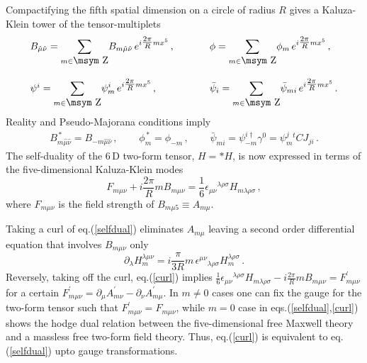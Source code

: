 \documentclass[a4paper,12pt]{article}
\def\Integer{{\mathop{\hbox{\msym \char  '132}}}}
\def\pr{{\textstyle{\frac{2\pi}{R}}}}
\begin{document}
\indent Compactifying the fifth spatial dimension on a circle of radius $R$ gives  
a Kaluza-Klein tower of the tensor-multiplets 
\begin{equation}
\begin{array}{ll}
B_{\hat{\mu}\hat{\nu}}=\displaystyle{\sum_{m\in\Integer}}B_{m\hat{\mu}\hat{\nu}}\,e^{i\pr mx^{5}}\,,~~~~&~~~~
\phi=\displaystyle{\sum_{m\in\Integer}}\phi_{m}\,e^{i\pr mx^{5}}\,,\\
{}&{}\\
\psi^{i}=\displaystyle{\sum_{m\in\Integer}}\psi^{i}_{m}\,e^{i\pr mx^{5}}\,,~~~~&~~~~
\bar{\psi}_{i}=\displaystyle{\sum_{m\in\Integer}}\bar{\psi}_{mi}\,e^{i\pr mx^{5}}\,.
\end{array}
\end{equation} 
Reality and Pseudo-Majorana conditions imply
\begin{equation}
\begin{array}{ccc}
B_{m\hat{\mu}\hat{\nu}}^{\,*}=B_{-m\hat{\mu}\hat{\nu}}\,,~~~&~~~
\phi_{m}^{\,*}=\phi_{-m}\,,~~~&~~~
\bar{\psi}_{mi}=\psi_{-m}^{i\dagger}\gamma^{0}=\psi_{m}^{j}{}^{t}CJ_{ji}\,.
\end{array}
\label{realpM}
\end{equation}
The self-duality of the $6$\,D two-form tensor, $H=* H$, is now expressed in terms of the five-dimensional Kaluza-Klein  modes
\begin{equation}
F_{m\mu\nu}+i\pr mB_{m\mu\nu}=\textstyle{\frac{1}{6}}\epsilon_{\mu\nu}{}^{\lambda\rho\sigma}H_{m\lambda\rho\sigma}\,,
\label{selfdual}
\end{equation}
where $F_{m\mu\nu}$ is the field strength of $B_{m\mu 5}\equiv A_{m\mu}$.  \newline



Taking a curl of eq.(\ref{selfdual}) eliminates $A_{m\mu}$ leaving a second order  differential equation that involves $B_{m\mu\nu}$ only
\begin{equation}
\partial_{\lambda}H_{m}^{\lambda\mu\nu}=i\textstyle{\frac{\pi}{3R}}m\,\epsilon^{\mu\nu}{}_{\lambda\rho\sigma}H_{m}^{\lambda\rho\sigma}\,.
\label{curl}
\end{equation}
Reversely,  taking off the curl,   eq.(\ref{curl}) implies  $\textstyle{\frac{1}{6}}\epsilon_{\mu\nu}{}^{\lambda\rho\sigma}H_{m\lambda\rho\sigma}-i\pr mB_{m\mu\nu}=F_{m\mu\nu}^{\prime}$ for a certain $F^{\prime}_{m\mu\nu}=\partial_{\mu}A_{m\nu}^{\prime}-\partial_{\nu}A_{m\mu}^{\prime}$. In $m\neq 0$ cases  one can fix the gauge for the two-form tensor such that  $F_{m\mu\nu}^{\prime}=F_{m\mu\nu}$, while  $m=0$ case in eqs.(\ref{selfdual},\ref{curl}) shows the hodge dual relation between the five-dimensional free Maxwell theory and a massless free two-form field theory. Thus, eq.(\ref{curl}) is equivalent to eq.(\ref{selfdual}) upto gauge transformations.\newline
\end{document}
